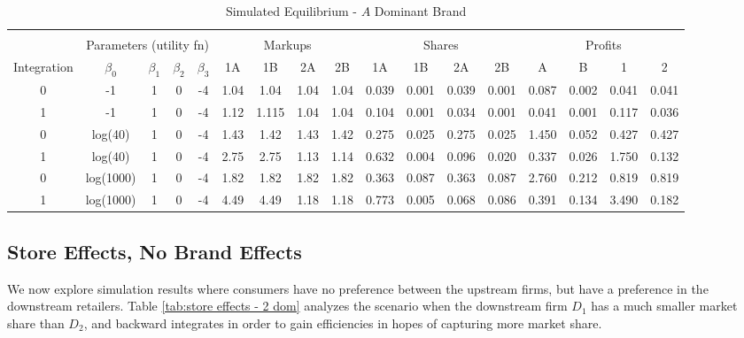 \documentclass[12pt]{article}%
\begin{document}
\begin{table}[h]
{\begin{tabular}{c|cccc|cccc|cccc|cccc}
    \multicolumn{1}{c}{} &       &       &       & \multicolumn{1}{c}{} &       &       &       & \multicolumn{1}{c}{} &       &       &       & \multicolumn{1}{c}{} &       &       &       &  \\
          & \multicolumn{4}{c|}{Parameters (utility fn)} & \multicolumn{4}{c|}{Markups}  & \multicolumn{4}{c|}{Shares}   & \multicolumn{4}{c}{Profits} \\
    \midrule
    \multicolumn{1}{c|}{Integration} & \multicolumn{1}{c}{$\beta_0$} & \multicolumn{1}{c}{$\beta_1$} & \multicolumn{1}{c}{$\beta_2$} & \multicolumn{1}{c|}{$\beta_3$} & \multicolumn{1}{c}{1A} & \multicolumn{1}{c}{1B} & \multicolumn{1}{c}{2A} & \multicolumn{1}{c|}{2B} & \multicolumn{1}{c}{1A} & \multicolumn{1}{c}{1B} & \multicolumn{1}{c}{2A} & \multicolumn{1}{c|}{2B} & \multicolumn{1}{c}{A} & \multicolumn{1}{c}{B} & \multicolumn{1}{c}{1} & \multicolumn{1}{c}{2} \\
    \midrule
    \midrule
 0     & -1    & 1     & 0     & -4    & 1.04  & 1.04  & 1.04  & 1.04  & 0.039 & 0.001 & 0.039 & 0.001 & 0.087 & 0.002 & 0.041 & 0.041 \\
    1     & -1    & 1     & 0     & -4    & 1.12  & 1.115 & 1.04  & 1.04  & 0.104 & 0.001 & 0.034 & 0.001 & 0.041 & 0.001 & 0.117 & 0.036 \\
    0     & log(40) & 1     & 0     & -4    & 1.43  & 1.42  & 1.43  & 1.42  & 0.275 & 0.025 & 0.275 & 0.025 & 1.450 & 0.052 & 0.427 & 0.427 \\
    1     & log(40) & 1     & 0     & -4    & 2.75  & 2.75  & 1.13  & 1.14  & 0.632 & 0.004 & 0.096 & 0.020 & 0.337 & 0.026 & 1.750 & 0.132 \\
    0     & log(1000) & 1     & 0     & -4    & 1.82  & 1.82  & 1.82  & 1.82  & 0.363 & 0.087 & 0.363 & 0.087 & 2.760 & 0.212 & 0.819 & 0.819 \\
    1     & log(1000) & 1     & 0     & -4    & 4.49  & 4.49  & 1.18  & 1.18  & 0.773 & 0.005 & 0.068 & 0.086 & 0.391 & 0.134 & 3.490 & 0.182 \\

    \end{tabular}%
    }
    \caption{Simulated Equilibrium - $A$ Dominant Brand}
  \label{tab:brand effects - a dom}%
\end{table}%

\subsection{Store Effects, No Brand Effects}
\label{store effects}
We now explore simulation results where consumers have no preference between the upstream firms, but have a preference in the downstream retailers. Table \ref{tab:store effects - 2 dom} analyzes the scenario when the downstream firm $D_1$ has a much smaller market share than $D_2$, and backward integrates in order to gain efficiencies in hopes of capturing more market share. 
\end{document}
